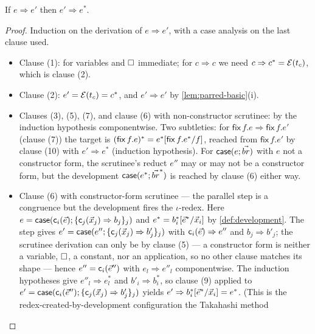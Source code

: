 \begin{lemma}
\label{lem:triangle}
If $e \Rightarrow e'$ then $e' \Rightarrow e^{\ast}$.
\end{lemma}

\begin{proof}
Induction on the derivation of $e \Rightarrow e'$, with a case analysis
on the last clause used.
\begin{itemize}[leftmargin=2em]
\item Clause (1): for variables and $\square$ immediate; for $c \Rightarrow
  c$ we need $c \Rightarrow c^{\ast} = \mathcal{E}(t_c)$, which is clause
  (2).
\item Clause (2): $e' = \mathcal{E}(t_c) = c^{\ast}$, and $e' \Rightarrow e'$
  by \cref{lem:parred-basic}(i).
\item Clauses (3), (5), (7), and clause (6) with non-constructor
  scrutinee: by the induction hypothesis componentwise.  Two
  subtleties: for $\mathsf{fix}\,f.e \Rightarrow \mathsf{fix}\,f.e'$
  (clause (7)) the target is $(\mathsf{fix}\,f.e)^{\ast} =
  e^{\ast}[\mathsf{fix}\,f.e^{\ast}/f]$, reached from
  $\mathsf{fix}\,f.e'$ by clause (10) with $e' \Rightarrow e^{\ast}$
  (induction hypothesis).  For $\mathsf{case}(e; \vec{br})$ with $e$
  not a constructor form, the scrutinee's reduct $e''$ may or may not
  be a constructor form, but the development
  $\mathsf{case}(e^{\ast}; \vec{br}^{\ast})$ is reached by clause (6)
  either way.
\item Clause (6) with constructor-form scrutinee --- the parallel step
  is a congruence but the development fires the $\iota$-redex.  Here $e
  = \mathsf{case}(\mathsf{c}_i(\vec{e}); \{\mathsf{c}_j(\vec{x}_j)
  \Rightarrow b_j\}_j)$ and $e^{\ast} =
  b_i^{\ast}[\vec{e}^{\ast}/\vec{x}_i]$ by
  \cref{def:development}.  The step gives $e' =
  \mathsf{case}(e''; \{\mathsf{c}_j(\vec{x}_j) \Rightarrow b'_j\}_j)$
  with $\mathsf{c}_i(\vec{e}) \Rightarrow e''$ and $b_j \Rightarrow
  b'_j$; the scrutinee derivation can only be by clause (5) --- a
  constructor form is neither a variable, $\square$, a constant, nor an
  application, so no other clause matches its shape --- hence $e'' =
  \mathsf{c}_i(\vec{e}'')$ with $e_l \Rightarrow e''_l$ componentwise.
  The induction hypotheses give $e''_l \Rightarrow e_l^{\ast}$ and
  $b'_i \Rightarrow b_i^{\ast}$, so clause (9) applied to $e' =
  \mathsf{case}(\mathsf{c}_i(\vec{e}''); \{\mathsf{c}_j(\vec{x}_j)
  \Rightarrow b'_j\}_j)$ yields $e' \Rightarrow
  b_i^{\ast}[\vec{e}^{\ast}/\vec{x}_i] = e^{\ast}$.  (This is
  the redex-created-by-development configuration the Takahashi method

\end{itemize}
\end{proof}
